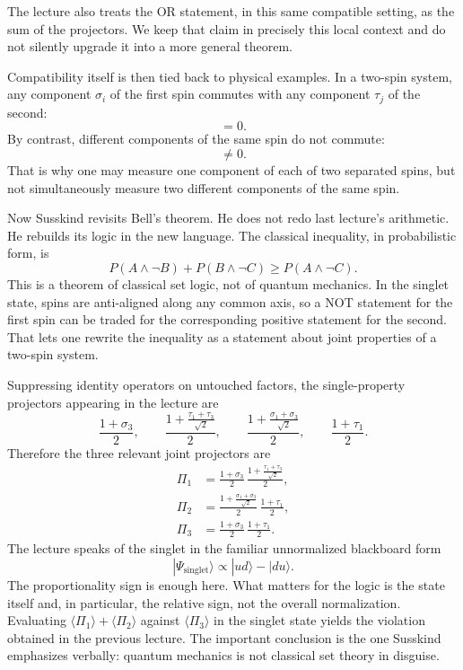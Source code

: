 \begin{remark}
The lecture also treats the OR statement, in this same compatible setting, as the sum of the projectors. We keep that claim in precisely this local context and do not silently upgrade it into a more general theorem.
\end{remark}

Compatibility itself is then tied back to physical examples. In a two-spin system, any component \(\sigma_i\) of the first spin commutes with any component \(\tau_j\) of the second:
\begin{equation}
[\sigma_i,\tau_j]=0.
\end{equation}
By contrast, different components of the same spin do not commute:
\begin{equation}
[\sigma_1,\sigma_3]\neq 0.
\end{equation}
That is why one may measure one component of each of two separated spins, but not simultaneously measure two different components of the same spin.

Now Susskind revisits Bell's theorem. He does not redo last lecture's arithmetic. He rebuilds its logic in the new language. The classical inequality, in probabilistic form, is
\begin{equation}
P(A\wedge \neg B)+P(B\wedge \neg C)\ge P(A\wedge \neg C).
\end{equation}
This is a theorem of classical set logic, not of quantum mechanics. In the singlet state, spins are anti-aligned along any common axis, so a NOT statement for the first spin can be traded for the corresponding positive statement for the second. That lets one rewrite the inequality as a statement about joint properties of a two-spin system.

Suppressing identity operators on untouched factors, the single-property projectors appearing in the lecture are
\begin{equation}
\frac{1+\sigma_3}{2},\qquad
\frac{1+\frac{\tau_1+\tau_3}{\sqrt2}}{2},\qquad
\frac{1+\frac{\sigma_1+\sigma_3}{\sqrt2}}{2},\qquad
\frac{1+\tau_1}{2}.
\end{equation}
Therefore the three relevant joint projectors are
\begin{align}
\Pi_1 &= \frac{1+\sigma_3}{2}\,\frac{1+\frac{\tau_1+\tau_3}{\sqrt2}}{2}, \\
\Pi_2 &= \frac{1+\frac{\sigma_1+\sigma_3}{\sqrt2}}{2}\,\frac{1+\tau_1}{2}, \\
\Pi_3 &= \frac{1+\sigma_3}{2}\,\frac{1+\tau_1}{2}.
\end{align}
The lecture speaks of the singlet in the familiar unnormalized blackboard form
\begin{equation}
|\Psi_{\mathrm{singlet}}\rangle \propto |ud\rangle-|du\rangle.
\end{equation}
The proportionality sign is enough here. What matters for the logic is the state itself and, in particular, the relative sign, not the overall normalization. Evaluating \(\langle \Pi_1\rangle+\langle \Pi_2\rangle\) against \(\langle \Pi_3\rangle\) in the singlet state yields the violation obtained in the previous lecture. The important conclusion is the one Susskind emphasizes verbally: quantum mechanics is not classical set theory in disguise.

